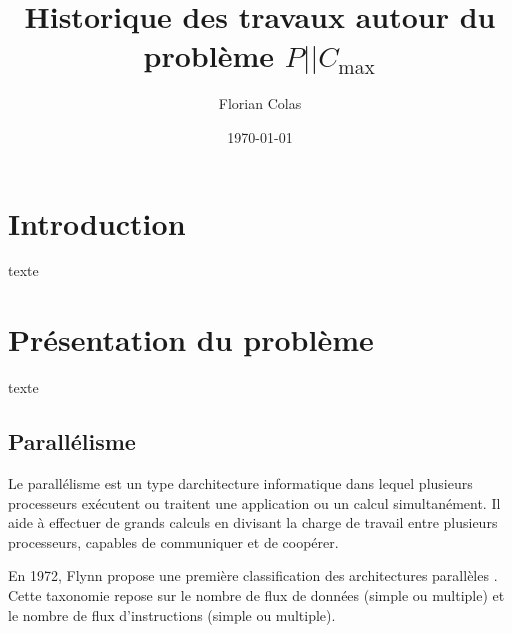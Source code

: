 \documentclass[a4paper,12pt]{report}
\title{Historique des travaux autour du problème $P||C_{\max}$}
\author{Florian Colas}
\date{\today}
\theoremstyle{plain}				%
\theoremstyle{definition}				%
\begin{document}
\maketitle

%
%
%
\renewcommand{\thesection}{\arabic{section}}
\renewcommand{\contentsname}{Sommaire}
\setcounter{tocdepth}{4}	%
\setcounter{secnumdepth}{3}	%
\tableofcontents

\section{Introduction}

texte


\section{Présentation du problème}
texte
\subsection{Parallélisme}
Le parallélisme est un type d{\textquotesingle}architecture informatique
dans lequel plusieurs processeurs exécutent ou traitent une application
ou un calcul simultanément. Il aide à effectuer de grands calculs en
divisant la charge de travail entre plusieurs processeurs, capables de communiquer et de coopérer.

En 1972, Flynn propose une première classification des architectures
parallèles \cite{5009071}.
Cette taxonomie repose sur le nombre de flux de données (simple ou
multiple) et le nombre de flux d'instructions (simple ou multiple).
\end{document}
